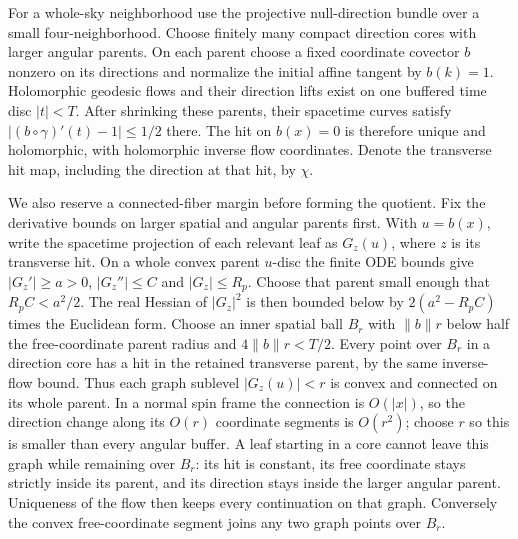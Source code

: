 \documentclass[
  english,
  11pt,
  reqno]{amsart}
\begin{document}
For a whole-sky neighborhood use the projective null-direction bundle
over a small four-neighborhood. Choose finitely many compact direction
cores with larger angular parents. On each parent choose a fixed
coordinate covector \(b\) nonzero on its directions and normalize the
initial affine tangent by \(b(k)=1\). Holomorphic geodesic flows and
their direction lifts exist on one buffered time disc \(|t|<T\). After
shrinking these parents, their spacetime curves satisfy
\(|(b\circ\gamma)'(t)-1|\le1/2\) there. The hit on \(b(x)=0\) is
therefore unique and holomorphic, with holomorphic inverse flow
coordinates. Denote the transverse hit map, including the direction at
that hit, by \(\chi\).

We also reserve a connected-fiber margin before forming the quotient.
Fix the derivative bounds on larger spatial and angular parents first.
With \(u=b(x)\), write the spacetime projection of each relevant leaf as
\(G_z(u)\), where \(z\) is its transverse hit. On a whole convex parent
\(u\)-disc the finite ODE bounds give \(|G_z'|\ge a>0\),
\(|G_z''|\le C\) and \(|G_z|\le R_p\). Choose that parent small enough
that \(R_pC<a^2/2\). The real Hessian of \(|G_z|^2\) is then bounded
below by \(2(a^2-R_pC)\) times the Euclidean form. Choose an inner
spatial ball \(B_r\) with \(\|b\|r\) below half the free-coordinate
parent radius and \(4\|b\|r<T/2\). Every point over \(B_r\) in a
direction core has a hit in the retained transverse parent, by the same
inverse-flow bound. Thus each graph sublevel \(|G_z(u)|<r\) is convex
and connected on its whole parent. In a normal spin frame the connection
is \(O(|x|)\), so the direction change along its \(O(r)\) coordinate
segments is \(O(r^2)\); choose \(r\) so this is smaller than every
angular buffer. A leaf starting in a core cannot leave this graph while
remaining over \(B_r\): its hit is constant, its free coordinate stays
strictly inside its parent, and its direction stays inside the larger
angular parent. Uniqueness of the flow then keeps every continuation on
that graph. Conversely the convex free-coordinate segment joins any two
graph points over \(B_r\).
\end{document}
